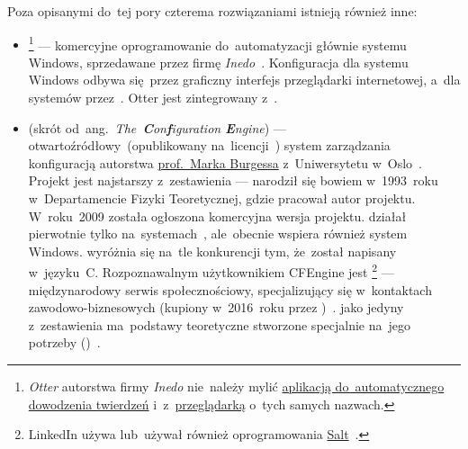 \documentclass[thesis]{subfiles}
\begin{document}
Poza opisanymi do~tej pory czterema rozwiązaniami istnieją również inne:\mynobreakpar
\begin{itemize}
	\item {}\footnote{\emph{Otter} autorstwa firmy \emph{Inedo} nie~należy mylić \href{https://en.wikipedia.org/wiki/Prover9\#Predecessor}{aplikacją do~automatycznego dowodzenia twierdzeń} i~z~\href{https://pl.wikipedia.org/wiki/Otter\_Browser}{przeglądarką} o~tych samych nazwach.} --- komercyjne oprogramowanie do~automatyzacji głównie systemu Windows, sprzedawane przez firmę \emph{Inedo}~\cite{otter}. Konfiguracja dla systemu Windows odbywa się~przez graficzny interfejs przeglądarki internetowej, a~dla systemów  przez~\ssh{}. Otter jest zintegrowany z~.
	\item\label{itm:cfengine} \emph{\cfengine{}} (skrót od~ang.~\emph{The~\textbf{C}on\textbf{f}iguration \textbf{E}ngine}) --- otwartoźródłowy~(opublikowany na~licencji~) system zarządzania konfiguracją autorstwa \href{https://en.wikipedia.org/wiki/Mark_Burgess_(computer_scientist)}{prof.~Marka Burgessa} z~Uniwersytetu w~Oslo~\cite{cfengine}. Projekt jest najstarszy z~zestawienia --- narodził się bowiem w~1993~roku w~Departamencie Fizyki Teoretycznej, gdzie pracował autor projektu. W~roku~2009 została ogłoszona komercyjna wersja projektu. \cfengine{} działał pierwotnie tylko na~systemach~, ale~obecnie wspiera również system Windows. \cfengine{} wyróżnia się na~tle konkurencji tym, że~został napisany w~języku~C. Rozpoznawalnym użytkownikiem CFEngine jest \footnote{LinkedIn używa lub~używał również oprogramowania \hyperref[sec:salt]{Salt}~\cite{salt-linkedin}.} --- międzynarodowy serwis społecznościowy, specjalizujący się w~kontaktach zawodowo-biznesowych (kupiony w~2016~roku przez )~\cite{cfengine-linkedin}. \cfengine{} jako jedyny z~zestawienia ma~podstawy teoretyczne stworzone specjalnie na~jego potrzeby ()~\cite{cfengine-whitepaper,mark-burgess-webpage}.

\end{itemize}
\end{document}
